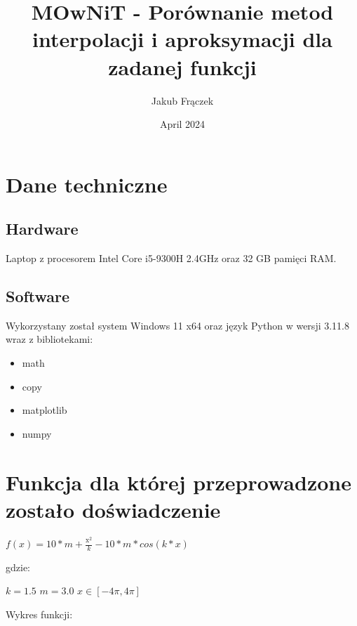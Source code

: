 \documentclass{article}
\title{MOwNiT - Porównanie metod interpolacji i aproksymacji dla zadanej funkcji}
\author{Jakub Frączek}
\date{April 2024}
\begin{document}
\maketitle

\section{Dane techniczne}

\subsection{Hardware}

Laptop z procesorem Intel Core i5-9300H 2.4GHz oraz 32 GB pamięci RAM.

\subsection{Software}

Wykorzystany został system Windows 11 x64 oraz język Python w wersji 3.11.8 wraz z bibliotekami:
\begin{itemize}
\item math
\item copy
\item matplotlib
\item numpy
\end{itemize}

\section{Funkcja dla której przeprowadzone zostało doświadczenie}

\begin{center}
\(f(x) = 10 * m + \frac{\mathrm{x}_{}^{2}}{k} - 10 * m * cos(k*x)\)
\end{center}

\noindent
gdzie:

\bigbreak

\(k = 1.5\)
\newline \indent
\(m = 3.0\)
\newline \indent
\(x \in [-4\pi, 4\pi]\)

\bigbreak

Wykres funkcji:
\end{document}
